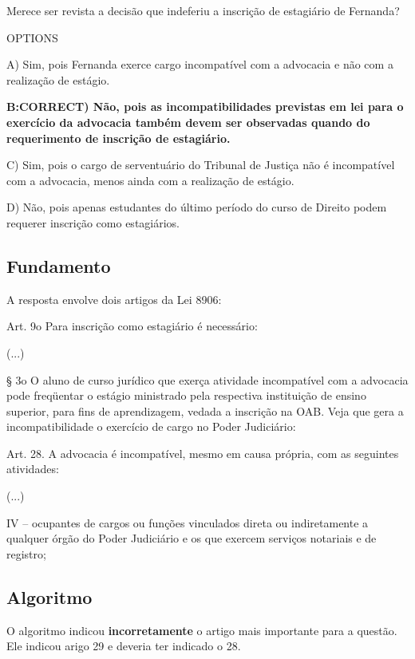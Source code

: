 \documentclass[12pt]{article}
\begin{document}
Merece ser revista a decisão que indeferiu a inscrição de 
estagiário de Fernanda? 
 
OPTIONS

A) Sim, pois Fernanda exerce cargo incompatível com a 
advocacia e não com a realização de estágio. 

\textbf{B:CORRECT) Não, pois as incompatibilidades previstas em lei para o exercício da advocacia também devem ser observadas quando do requerimento de inscrição de estagiário.}

C) Sim, pois o cargo de serventuário do Tribunal de Justiça 
não é incompatível com a advocacia, menos ainda com a 
realização de estágio. 

D) Não, pois apenas estudantes do último período do curso 
de Direito podem requerer inscrição como estagiários. 

\subsection{Fundamento}

A resposta envolve dois artigos da Lei 8906:

Art. 9o Para inscrição como estagiário é necessário:

(...)

§ 3o O aluno de curso jurídico que exerça atividade incompatível com a advocacia pode
freqüentar o estágio ministrado pela respectiva instituição de ensino superior, para fins de
aprendizagem, vedada a inscrição na OAB.
Veja que gera a incompatibilidade o exercício de cargo no Poder Judiciário:

Art. 28. A advocacia é incompatível, mesmo em causa própria, com as seguintes
atividades:

(...)

IV – ocupantes de cargos ou funções vinculados direta ou indiretamente a qualquer órgão
do Poder Judiciário e os que exercem serviços notariais e de registro;

\subsection{Algoritmo}

O algoritmo indicou \textbf{incorretamente} o artigo mais importante para a questão. Ele indicou arigo 29 e deveria ter indicado o 28.
\end{document}
